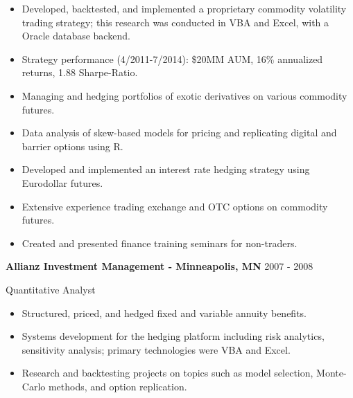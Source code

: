 \documentclass[11pt, a4paper]{awesome-cv}
\begin{document}
\begin{itemize}
\item
  Developed, backtested, and implemented a proprietary commodity
  volatility trading strategy; this research was conducted in VBA and
  Excel, with a Oracle database backend. \vspace{-0.5ex}
\item
  Strategy performance (4/2011-7/2014): \$20MM AUM, 16\% annualized
  returns, 1.88 Sharpe-Ratio. \vspace{-0.5ex}
\item
  Managing and hedging portfolios of exotic derivatives on various
  commodity futures. \vspace{-0.5ex}
\item
  Data analysis of skew-based models for pricing and replicating digital
  and barrier options using R. \vspace{-0.5ex}
\item
  Developed and implemented an interest rate hedging strategy using
  Eurodollar futures. \vspace{-0.5ex}
\item
  Extensive experience trading exchange and OTC options on commodity
  futures. \vspace{-0.5ex}
\item
  Created and presented finance training seminars for non-traders.
  \vspace{-0.5ex}
\end{itemize}

\normalsize

\textbf{Allianz Investment Management - Minneapolis, MN} \hfill 2007 -
2008

\vspace{-1ex}

Quantitative Analyst

\vspace{-1.5ex}

\small

\begin{itemize}
\item
  Structured, priced, and hedged fixed and variable annuity benefits.
  \vspace{-0.5ex}
\item
  Systems development for the hedging platform including risk analytics,
  sensitivity analysis; primary technologies were VBA and Excel.
  \vspace{-0.5ex}
\item
  Research and backtesting projects on topics such as model selection,
  Monte-Carlo methods, and option replication. \vspace{-0.5ex}
\end{itemize}
\end{document}
